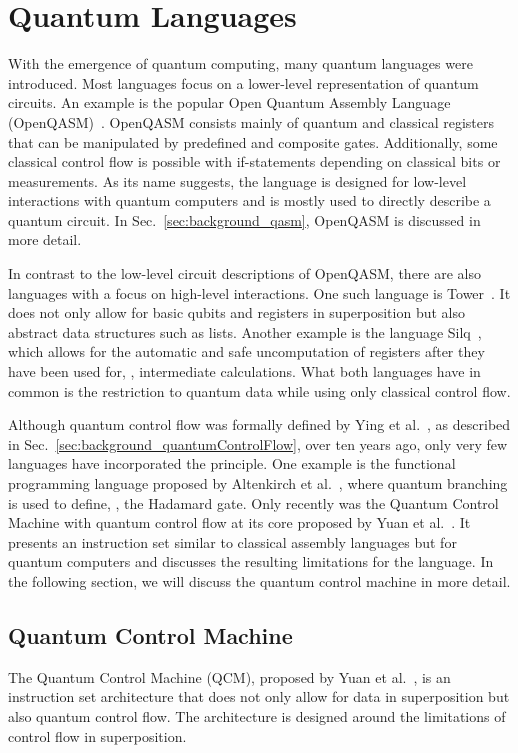\section{Quantum Languages}
\label{sec:background_quantumLanguages}
With the emergence of quantum computing, many quantum languages were introduced. Most languages focus on a lower-level representation of quantum circuits. An example is the popular Open Quantum Assembly Language (OpenQASM)~\cite{CBSG17}. OpenQASM consists mainly of quantum and classical registers that can be manipulated by predefined and composite gates. Additionally, some classical control flow is possible with if-statements depending on classical bits or measurements. As its name suggests, the language is designed for low-level interactions with quantum computers and is mostly used to directly describe a quantum circuit. In Sec.~\ref{sec:background_qasm}, OpenQASM is discussed in more detail. 

In contrast to the low-level circuit descriptions of OpenQASM, there are also languages with a focus on high-level interactions. One such language is Tower~\cite{YuCa22}. It does not only allow for basic qubits and registers in superposition but also abstract data structures such as lists. Another example is the language Silq~\cite{BBGV20}, which allows for the automatic and safe uncomputation of registers after they have been used for, \eg, intermediate calculations. What both languages have in common is the restriction to quantum data while using only classical control flow. 

Although quantum control flow was formally defined by Ying et al.~\cite{YYF12}, as described in Sec.~\ref{sec:background_quantumControlFlow}, over ten years ago, only very few languages have incorporated the principle. One example is the functional programming language proposed by Altenkirch et al.~\cite{AlGr05}, where quantum branching is used to define, \eg, the Hadamard gate. Only recently was the Quantum Control Machine with quantum control flow at its core proposed by Yuan et al.~\cite{YVC24}. It presents an instruction set similar to classical assembly languages but for quantum computers and discusses the resulting limitations for the language. In the following section, we will discuss the quantum control machine in more detail.

\subsection{Quantum Control Machine}
\label{sec:background_quantumControlMachine}
The Quantum Control Machine (QCM), proposed by Yuan et al.~\cite{YVC24}, is an instruction set architecture that does not only allow for data in superposition but also quantum control flow. The architecture is designed around the limitations of control flow in superposition. 

